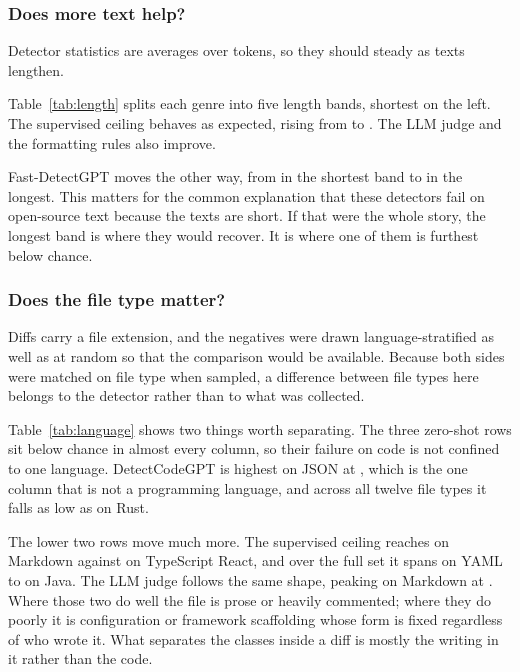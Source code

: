 \subsubsection{Does more text help?}
\label{sec:validity:rq2:length}

Detector statistics are averages over tokens, so they should steady as texts lengthen.



Table~\ref{tab:length} splits each genre into five length bands, shortest on the left.
The supervised ceiling behaves as expected, rising from \CeilingShortAuroc{} to
\CeilingLongAuroc{}. The LLM judge and the formatting rules also improve.

Fast-DetectGPT moves the other way, from \FastDetectShortAuroc{} in the shortest band to
\FastDetectLongAuroc{} in the longest. This matters for the common explanation that
these detectors fail on open-source text because the texts are short. If that were the
whole story, the longest band is where they would recover. It is where one of them is
furthest below chance.

\subsubsection{Does the file type matter?}
\label{sec:validity:rq2:language}

Diffs carry a file extension, and the negatives were drawn language-stratified as well
as at random so that the comparison would be available. Because both sides were matched
on file type when sampled, a difference between file types here belongs to the detector
rather than to what was collected.



Table~\ref{tab:language} shows two things worth separating. The three zero-shot rows sit
below chance in almost every column, so their failure on code is not confined to one
language. DetectCodeGPT is highest on JSON at , which is the one column
that is not a programming language, and across all twelve file types it falls as low as
 on Rust.

The lower two rows move much more. The supervised ceiling reaches  on
Markdown against  on TypeScript React, and over the full set it spans
 on YAML to  on Java. The LLM judge follows the same
shape, peaking on Markdown at . Where those two do well the file is
prose or heavily commented; where they do poorly it is configuration or framework
scaffolding whose form is fixed regardless of who wrote it. What separates the classes
inside a diff is mostly the writing in it rather than the code.

